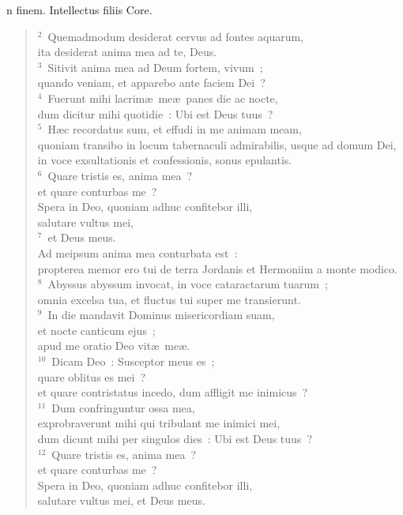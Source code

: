 \bchapter[Psalm]
n finem. Intellectus filiis Core.
\begin{verse}${}^{2}$~Quemadmodum desiderat cervus ad fontes aquarum,\\ ita desiderat anima mea ad te, Deus.\\
${}^{3}$~Sitivit anima mea ad Deum fortem, vivum~;\\ quando veniam, et apparebo ante faciem Dei~?\\
${}^{4}$~Fuerunt mihi lacrim\ae\ me\ae\ panes die ac nocte,\\ dum dicitur mihi quotidie~: Ubi est Deus tuus~?\\
${}^{5}$~H\ae c recordatus sum, et effudi in me animam meam,\\ quoniam transibo in locum tabernaculi admirabilis, usque ad domum Dei,\\ in voce exsultationis et confessionis, sonus epulantis.\\
${}^{6}$~Quare tristis es, anima mea~?\\ et quare conturbas me~?\\ Spera in Deo, quoniam adhuc confitebor illi,\\ salutare vultus mei,\\
${}^{7}$~et Deus meus.\\ Ad meipsum anima mea conturbata est~:\\ propterea memor ero tui de terra Jordanis et Hermoniim a monte modico.\\
${}^{8}$~Abyssus abyssum invocat, in voce cataractarum tuarum~;\\ omnia excelsa tua, et fluctus tui super me transierunt.\\
${}^{9}$~In die mandavit Dominus misericordiam suam,\\ et nocte canticum ejus~;\\ apud me oratio Deo vit\ae\ me\ae .\\
${}^{10}$~Dicam Deo~: Susceptor meus es~;\\ quare oblitus es mei~?\\ et quare contristatus incedo, dum affligit me inimicus~?\\
${}^{11}$~Dum confringuntur ossa mea,\\ exprobraverunt mihi qui tribulant me inimici mei,\\ dum dicunt mihi per singulos dies~: Ubi est Deus tuus~?\\
${}^{12}$~Quare tristis es, anima mea~?\\ et quare conturbas me~?\\ Spera in Deo, quoniam adhuc confitebor illi,\\ salutare vultus mei, et Deus meus.\end{verse}



